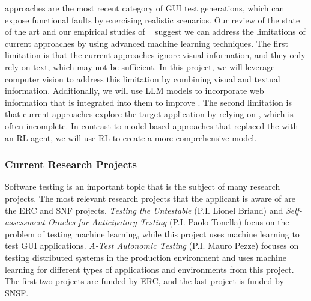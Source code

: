 
\smallskip 
\testreuse approaches are the most recent category of GUI test generations, which can expose functional faults by exercising realistic scenarios. Our review of the state of the art and our empirical studies of \testreuse~\cite{mariani:SemFinder:ISSTA:2021,khalili:DomainEmbedding:ICPC:2022} suggest we can address the limitations of current approaches by using advanced machine learning techniques. 
The first limitation is that the current \testreuse approaches ignore visual information, and they only rely on text, which may not be sufficient. 
In this project, we will leverage computer vision to address this limitation by combining visual and textual information.
Additionally, we will use LLM models to incorporate web information that is integrated into them to improve \testreuse. 
The second limitation is that current approaches explore the target application by relying on \tam, which is often incomplete.
In contrast to model-based approaches that replaced the \tam with an RL agent, we will use RL to create a more comprehensive model.


\subsubsection{Current Research Projects}

Software testing is an important topic that is the subject of many research projects. The most relevant research projects that the applicant is aware of are the ERC and SNF projects. \textit{Testing the Untestable} (P.I. Lionel Briand) and \textit{Self-assessment Oracles for Anticipatory Testing} (P.I. Paolo Tonella) focus on the problem of testing machine learning, while this project uses machine learning to test GUI applications. \textit{A-Test Autonomic Testing} (P.I. Mauro Pezze) focuses on testing distributed systems in the production environment and uses machine learning for different types of applications and environments from this project. The first two projects are funded by ERC, and the last project is funded by SNSF. 


